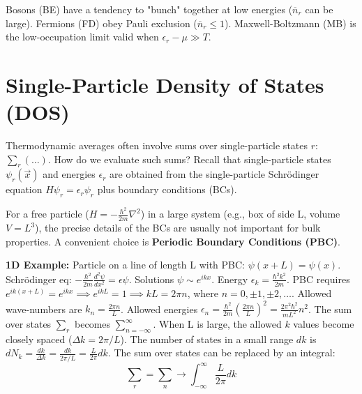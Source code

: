 \documentclass[11pt]{article}
\newcommand{\eps}{\epsilon}
\begin{document}
\begin{center}
\end{center}
Bosons (BE) have a tendency to "bunch" together at low energies ($\overline{n}_r$ can be large). Fermions (FD) obey Pauli exclusion ($\overline{n}_r \le 1$). Maxwell-Boltzmann (MB) is the low-occupation limit valid when $\eps_r - \mu \gg T$.

\section*{Single-Particle Density of States (DOS)}

Thermodynamic averages often involve sums over single-particle states $r$: $\sum_r (\dots)$.
How do we evaluate such sums?
Recall that single-particle states $\psi_r(\vec{x})$ and energies $\eps_r$ are obtained from the single-particle Schrödinger equation $H \psi_r = \eps_r \psi_r$ plus boundary conditions (BCs).

For a free particle ($H = -\frac{\hbar^2}{2m} \nabla^2$) in a large system (e.g., box of side L, volume $V=L^3$), the precise details of the BCs are usually not important for bulk properties. A convenient choice is \textbf{Periodic Boundary Conditions (PBC)}.

\textbf{1D Example:} Particle on a line of length L with PBC: $\psi(x+L) = \psi(x)$.
Schrödinger eq: $-\frac{\hbar^2}{2m} \frac{d^2\psi}{dx^2} = \eps \psi$. Solutions $\psi \sim e^{ikx}$.
Energy $\eps_k = \frac{\hbar^2 k^2}{2m}$.
PBC requires $e^{ik(x+L)} = e^{ikx} \implies e^{ikL}=1 \implies kL = 2\pi n$, where $n=0, \pm 1, \pm 2, \dots$.
Allowed wave-numbers are $k_n = \frac{2\pi n}{L}$.
Allowed energies $\eps_n = \frac{\hbar^2}{2m} (\frac{2\pi n}{L})^2 = \frac{2\pi^2\hbar^2}{mL^2} n^2$.
The sum over states $\sum_r$ becomes $\sum_{n=-\infty}^{\infty}$.
When L is large, the allowed $k$ values become closely spaced ($\Delta k = 2\pi/L$).
The number of states in a small range $dk$ is $dN_k = \frac{dk}{\Delta k} = \frac{dk}{2\pi/L} = \frac{L}{2\pi} dk$.
The sum over states can be replaced by an integral:
\[ \sum_r = \sum_n \longrightarrow \int_{-\infty}^{\infty} \frac{L}{2\pi} dk \]
\end{document}
